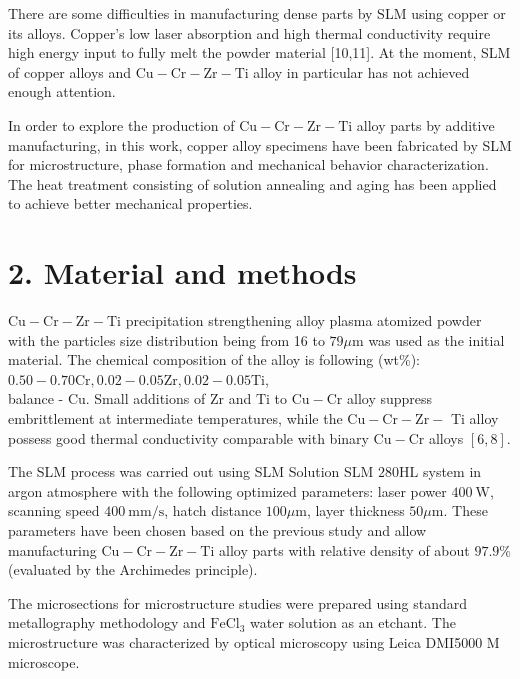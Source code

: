 \documentclass[10pt]{article}
\begin{document}
There are some difficulties in manufacturing dense parts by SLM using copper or its alloys. Copper's low laser absorption and high thermal conductivity require high energy input to fully melt the powder material [10,11]. At the moment, SLM of copper alloys and $\mathrm{Cu}-\mathrm{Cr}-\mathrm{Zr}-\mathrm{Ti}$ alloy in particular has not achieved enough attention.

In order to explore the production of $\mathrm{Cu}-\mathrm{Cr}-\mathrm{Zr}-\mathrm{Ti}$ alloy parts by additive manufacturing, in this work, copper alloy specimens have been fabricated by SLM for microstructure, phase formation and mechanical behavior characterization. The heat treatment consisting of solution annealing and aging has been applied to achieve better mechanical properties.

\section*{2. Material and methods}
$\mathrm{Cu}-\mathrm{Cr}-\mathrm{Zr}-\mathrm{Ti}$ precipitation strengthening alloy plasma atomized powder with the particles size distribution being from 16 to $79 \mu \mathrm{m}$ was used as the initial material. The chemical composition of the alloy is following (wt\%): $0.50-0.70 \mathrm{Cr}, 0.02-0.05 \mathrm{Zr}, 0.02-0.05 \mathrm{Ti}$,\\
balance - Cu. Small additions of $\mathrm{Zr}$ and $\mathrm{Ti}$ to $\mathrm{Cu}-\mathrm{Cr}$ alloy suppress embrittlement at intermediate temperatures, while the $\mathrm{Cu}-\mathrm{Cr}-\mathrm{Zr}-$ Ti alloy possess good thermal conductivity comparable with binary $\mathrm{Cu}-\mathrm{Cr}$ alloys $[6,8]$.

The SLM process was carried out using SLM Solution SLM $280 \mathrm{HL}$ system in argon atmosphere with the following optimized parameters: laser power $400 \mathrm{~W}$, scanning speed $400 \mathrm{~mm} / \mathrm{s}$, hatch distance $100 \mu \mathrm{m}$, layer thickness $50 \mu \mathrm{m}$. These parameters have been chosen based on the previous study and allow manufacturing $\mathrm{Cu}-\mathrm{Cr}-\mathrm{Zr}-\mathrm{Ti}$ alloy parts with relative density of about $97.9 \%$ (evaluated by the Archimedes principle).

The microsections for microstructure studies were prepared using standard metallography methodology and $\mathrm{FeCl}_{3}$ water solution as an etchant. The microstructure was characterized by optical microscopy using Leica DMI5000 M microscope.
\end{document}
